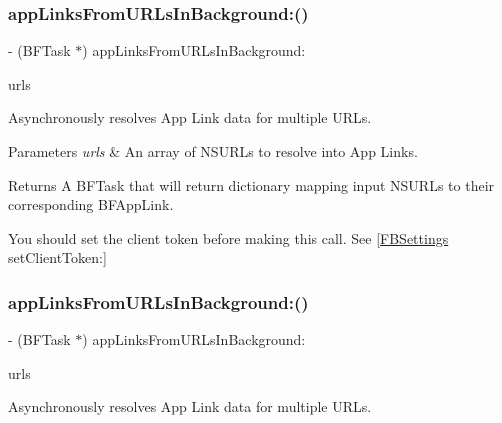 \subsubsection{\texorpdfstring{app\+Links\+From\+U\+R\+Ls\+In\+Background\+:()}{appLinksFromURLsInBackground:()}\hspace{0.1cm}{\footnotesize\ttfamily [2/5]}}
{\footnotesize\ttfamily -\/ (B\+F\+Task $\ast$) app\+Links\+From\+U\+R\+Ls\+In\+Background\+: \begin{DoxyParamCaption}\item[{(N\+S\+Array $\ast$)}]{urls }\end{DoxyParamCaption}}

Asynchronously resolves App Link data for multiple U\+R\+Ls.


\begin{DoxyParams}{Parameters}
{\em urls} & An array of N\+S\+U\+R\+Ls to resolve into App Links. \\
\hline
\end{DoxyParams}
\begin{DoxyReturn}{Returns}
A B\+F\+Task that will return dictionary mapping input N\+S\+U\+R\+Ls to their corresponding B\+F\+App\+Link.
\end{DoxyReturn}
You should set the client token before making this call. See {\ttfamily \mbox{[}\hyperlink{interfaceFBSettings}{F\+B\+Settings} set\+Client\+Token\+:\mbox{]}} \mbox{\label{interfaceFBAppLinkResolver_aefdaa81da8bc6105172f4f2632c12daa}} 
\subsubsection{\texorpdfstring{app\+Links\+From\+U\+R\+Ls\+In\+Background\+:()}{appLinksFromURLsInBackground:()}\hspace{0.1cm}{\footnotesize\ttfamily [3/5]}}
{\footnotesize\ttfamily -\/ (B\+F\+Task $\ast$) app\+Links\+From\+U\+R\+Ls\+In\+Background\+: \begin{DoxyParamCaption}\item[{(N\+S\+Array $\ast$)}]{urls }\end{DoxyParamCaption}}

Asynchronously resolves App Link data for multiple U\+R\+Ls.


